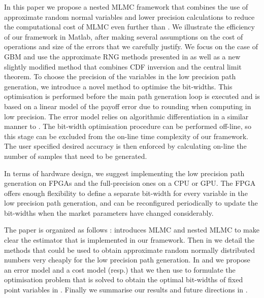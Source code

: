 In this paper we propose a nested MLMC framework that combines the use of approximate random normal variables and lower precision calculations to reduce the computational cost of MLMC even further than \cite{brugger2014mixed,NestedOliver}. We illustrate the efficiency of our framework in Matlab, after making several assumptions on the cost of operations and size of the errors that we carefully justify. We focus on the case of GBM and use the approximate RNG methods presented in \cite{approximateICDF_Oliver} as well as a new slightly modified method that combines CDF inversion and the central limit theorem. To choose the precision of the variables in the low precision path generation, we introduce a novel method to optimise the bit-widths. This optimisation is performed before the main path generation loop is executed and is based on a linear model of the payoff error  
due to rounding when computing in low precision. The error model relies on algorithmic differentiation in a similar manner to \cite{unifying-bwoptim,bitwidth-AD,ADAPT}. The bit-width optimisation procedure can be performed off-line, so this stage can be excluded from the on-line time complexity of our framework. The user specified desired accuracy is then enforced by calculating on-line the number of samples that need to be generated.

In terms of hardware design, we suggest implementing the low precision path generation on FPGAs and the full-precision ones on a CPU or GPU. 
The FPGA offers enough flexibility to define a separate bit-width for every variable in the low precision path generation, and can be reconfigured periodically to update the bit-widths when the market parameters have changed considerably. 


The paper is organized as follows :  introduces MLMC and nested MLMC to make clear the estimator that is implemented in our framework. Then in  we detail the methods that could be used to obtain approximate random normally distributed numbers very cheaply for the low precision path generation. In  and  we propose an error model and a cost model (resp.) that we then use to formulate the optimisation problem that is solved to obtain the optimal bit-widths of fixed point variables in . Finally we summarise our results and future directions in .


